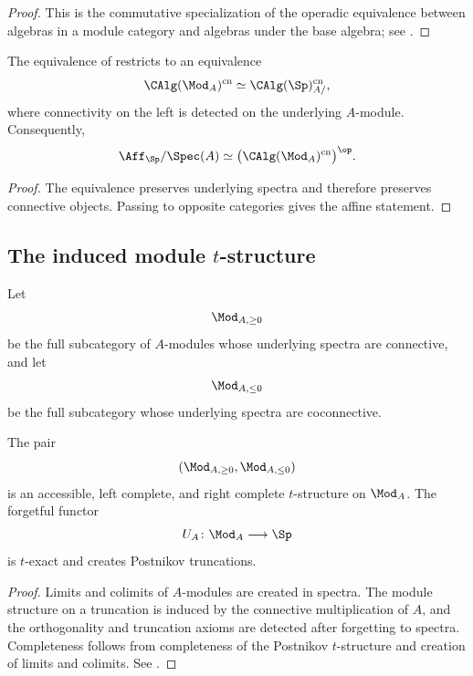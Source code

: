 \begin{proof}
This is the commutative specialization of the operadic equivalence between
algebras in a module category and algebras under the base algebra; see
\cite[Corollary~3.4.1.7]{LurieHigherAlgebra}.
\end{proof}

\begin{proposition}
\label{prop:connective-relative-algebras}
The equivalence of 
restricts to an equivalence
\[
    \CAlg(\Mod_A)^{\mathrm{cn}}
    \simeq
    \CAlg(\Sp)^{\mathrm{cn}}_{A/},
\]
where connectivity on the left is detected on the underlying $A$-module.
Consequently,
\[
    \Aff_{\Sp}/\Spec(A)
    \simeq
    \bigl(
        \CAlg(\Mod_A)^{\mathrm{cn}}
    \bigr)^{\op}.
\]
\end{proposition}

\begin{proof}
The equivalence preserves underlying spectra and therefore preserves
connective objects. Passing to opposite categories gives the affine
statement.
\end{proof}

\subsection{The induced module \texorpdfstring{$t$}{t}-structure}

\begin{definition}
\label{def:module-postnikov-t-structure}
Let
\[
    \Mod_{A,\geq0}
\]
be the full subcategory of $A$-modules whose underlying spectra are
connective, and let
\[
    \Mod_{A,\leq0}
\]
be the full subcategory whose underlying spectra are coconnective.
\end{definition}

\begin{proposition}
\label{prop:induced-module-t-structure}
The pair
\[
    (\Mod_{A,\geq0},\Mod_{A,\leq0})
\]
is an accessible, left complete, and right complete $t$-structure on
$\Mod_A$. The forgetful functor
\[
    U_A
    \colon
    \Mod_A
    \longrightarrow
    \Sp
\]
is $t$-exact and creates Postnikov truncations.
\end{proposition}

\begin{proof}
Limits and colimits of $A$-modules are created in spectra. The module
structure on a truncation is induced by the connective multiplication of
$A$, and the orthogonality and truncation axioms are detected after
forgetting to spectra. Completeness follows from completeness of the
Postnikov $t$-structure and creation of limits and colimits. See
\cite{LurieHigherAlgebra,LurieSAG}.
\end{proof}

